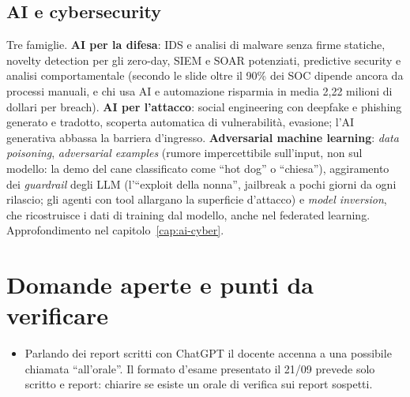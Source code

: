 \subsection{AI e cybersecurity}
Tre famiglie. \textbf{AI per la difesa}: IDS e analisi di malware senza firme statiche, novelty
detection per gli zero-day, SIEM e SOAR potenziati, predictive security e analisi comportamentale
(secondo le slide oltre il 90\% dei SOC dipende ancora da processi manuali, e chi usa AI e
automazione risparmia in media 2,22 milioni di dollari per breach). \textbf{AI per l'attacco}:
social engineering con deepfake e phishing generato e tradotto, scoperta automatica di vulnerabilità,
evasione; l'AI generativa abbassa la barriera d'ingresso. \textbf{Adversarial machine learning}:
\emph{data poisoning}, \emph{adversarial examples} (rumore impercettibile sull'input, non sul modello:
la demo del cane classificato come ``hot dog'' o ``chiesa''), aggiramento dei \emph{guardrail} degli
LLM (l'``exploit della nonna'', jailbreak a pochi giorni da ogni rilascio; gli agenti con tool
allargano la superficie d'attacco) e \emph{model inversion}, che ricostruisce i dati di training dal
modello, anche nel federated learning. Approfondimento nel capitolo~\ref{cap:ai-cyber}.

\section{Domande aperte e punti da verificare}
\begin{verifica}
\begin{itemize}
  \item Parlando dei report scritti con ChatGPT il docente accenna a una possibile chiamata
    ``all'orale''. Il formato d'esame presentato il 21/09 prevede solo scritto e report: chiarire se
    esiste un orale di verifica sui report sospetti.
\end{itemize}
\end{verifica}
